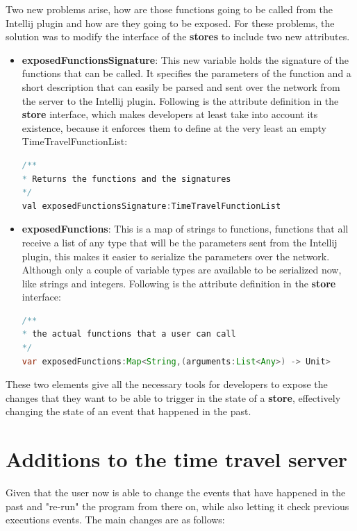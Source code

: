 Two new problems arise, how are those functions going to be called from the Intellij plugin and how are they going to be exposed. For these problems, the solution was to modify the interface of the \textbf{stores} to include two new attributes.

\begin{itemize}
   \item \textbf{exposedFunctionsSignature}: This new variable holds the signature of the functions that can be called. It specifies the parameters of the function and a short description that can easily be parsed and sent over the network from the server to the Intellij plugin. Following is the attribute definition in the \textbf{store} interface, which makes developers at least take into account its existence, because it enforces them to define at the very least an empty TimeTravelFunctionList:
  
\begin{lstlisting}[language=java]
/**
* Returns the functions and the signatures
*/
val exposedFunctionsSignature:TimeTravelFunctionList
\end{lstlisting}
	\item \textbf{exposedFunctions}: This is a map of strings to functions, functions that all receive a list of any type that will be the parameters sent from the Intellij plugin, this makes it easier to serialize the parameters over the network. Although only a couple of variable types are available to be serialized now, like strings and integers. Following is the attribute definition in the \textbf{store} interface:
\begin{lstlisting}[language=java]
/**
* the actual functions that a user can call
*/
var exposedFunctions:Map<String,(arguments:List<Any>) -> Unit>
\end{lstlisting}
\end{itemize}

These two elements give all the necessary tools for developers to expose the changes that they want to be able to trigger in the state of a \textbf{store}, effectively changing the state of an event that happened in the past.

\section{Additions to the time travel server}

Given that the user now is able to change the events that have happened in the past and "re-run" the program from there on, while also letting it check previous executions events. The main changes are as follows:

